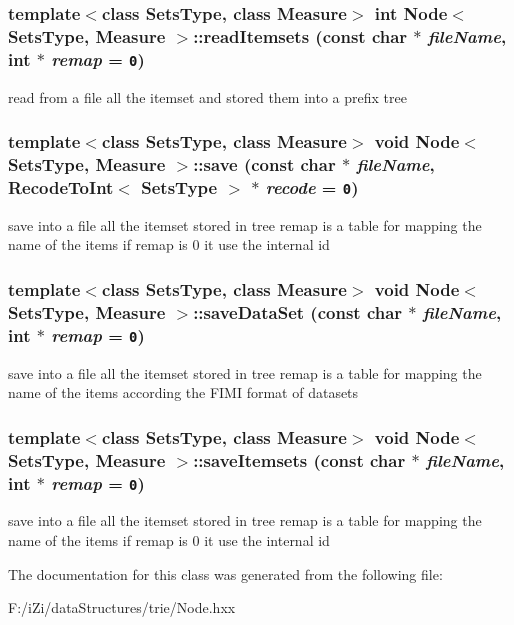 \subsubsection{\setlength{\rightskip}{0pt plus 5cm}template$<$class Sets\-Type, class Measure$>$ int {\bf Node}$<$ Sets\-Type, Measure $>$::read\-Itemsets (const char $\ast$ {\em file\-Name}, int $\ast$ {\em remap} = {\tt 0})}\label{class_node_05afc346678e3d677af92ae0941ace66}


read from a file all the itemset and stored them into a prefix tree 
\subsubsection{\setlength{\rightskip}{0pt plus 5cm}template$<$class Sets\-Type, class Measure$>$ void {\bf Node}$<$ Sets\-Type, Measure $>$::save (const char $\ast$ {\em file\-Name}, {\bf Recode\-To\-Int}$<$ Sets\-Type $>$ $\ast$ {\em recode} = {\tt 0})}\label{class_node_bab17c04ff98392f552c2e0fb21ae8b2}


save into a file all the itemset stored in tree remap is a table for mapping the name of the items if remap is 0 it use the internal id 
\subsubsection{\setlength{\rightskip}{0pt plus 5cm}template$<$class Sets\-Type, class Measure$>$ void {\bf Node}$<$ Sets\-Type, Measure $>$::save\-Data\-Set (const char $\ast$ {\em file\-Name}, int $\ast$ {\em remap} = {\tt 0})}\label{class_node_e57e552e42262a283c14f8f522b1ba16}


save into a file all the itemset stored in tree remap is a table for mapping the name of the items according the FIMI format of datasets 
\subsubsection{\setlength{\rightskip}{0pt plus 5cm}template$<$class Sets\-Type, class Measure$>$ void {\bf Node}$<$ Sets\-Type, Measure $>$::save\-Itemsets (const char $\ast$ {\em file\-Name}, int $\ast$ {\em remap} = {\tt 0})}\label{class_node_80f20886fd8cfda7e36a2ee0ba761c2c}


save into a file all the itemset stored in tree remap is a table for mapping the name of the items if remap is 0 it use the internal id 

The documentation for this class was generated from the following file:\begin{CompactItemize}
\item 
F:/i\-Zi/data\-Structures/trie/Node.hxx\end{CompactItemize}
